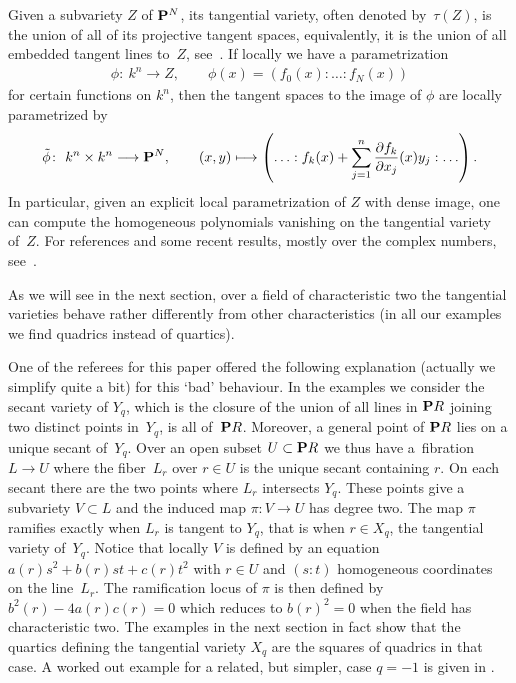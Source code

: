 \documentclass[10pt,a4paper]{amsart}
\newcommand{\PP}{{\bf P}}
\numberwithin{equation}{section}
\begin{document}
Given a subvariety $Z$ of $\PP^N$, its tangential variety, often denoted by~$\tau(Z)$, is the union of all of its projective tangent spaces, equivalently, it is the union of all embedded tangent lines to~$Z$, see~\cite{Z}. If locally we have a parametrization
\begin{gather*}
\phi\colon \ k^n \longrightarrow Z,\qquad \phi(x) = (f_0(x):\ldots:f_N(x))
\end{gather*}
for  certain functions on $k^n$, then the tangent spaces to the image of $\phi$ are locally parametrized by
\begin{gather*}
\tilde{\phi}\colon \ k^n\times k^n \longrightarrow \PP^N,\qquad (x,y) \longmapsto \left(\ldots: f_k(x)+\sum_{j=1}^n \frac{\partial f_k}{\partial x_j} (x)y_j:\ldots\right).
\end{gather*}
In particular, given an explicit local parametrization of $Z$ with dense image, one can compute the homogeneous polynomials vanishing on the tangential variety of~$Z$. For references and some recent results, mostly over the complex numbers, see~\cite{tangseg}.

As we will see in the next section, over a field of characteristic two the tangential varieties behave rather differently from other characteristics (in all our examples we find quadrics instead of quartics).

 One of the referees for this paper offered the following explanation (actually we simplify quite a bit) for this `bad' behaviour. In the examples we consider the secant variety of $Y_q$, which is the closure of the union of all lines in $\PP R$ joining two distinct points in~$Y_q$, is all of~$\PP R$. Moreover, a general point of $\PP R$ lies on a unique secant of~$Y_q$. Over an open subset $U\subset\PP R$ we thus have a~fibration $L\rightarrow U$ where the fiber~$L_r$ over $r\in U$ is the unique secant containing $r$.
On each secant there are the two points where $L_r$ intersects $Y_q$. These points give a subvariety $V\subset L$ and the induced map $\pi\colon V\rightarrow U$ has degree two. The map $\pi$ ramifies exactly when $L_r$ is tangent to $Y_q$, that is when $r\in X_q$, the tangential variety of~$Y_q$. Notice that locally $V$ is defined by an equation $a(r)s^2+b(r)st+c(r)t^2$ with $r\in U$ and $(s:t)$ homogeneous coordinates on the line~$L_r$. The ramification locus of $\pi$ is then defined by $b^2(r)-4a(r)c(r)=0$
which reduces to $b(r)^2=0$ when the field has characteristic two. The examples in the next section in fact show that the quartics defining the tangential variety $X_q$ are the squares of quadrics in that case. A worked out example for a related, but simpler, case $q=-1$ is given in \cite[Example~4.7]{Russo}.
\end{document}
